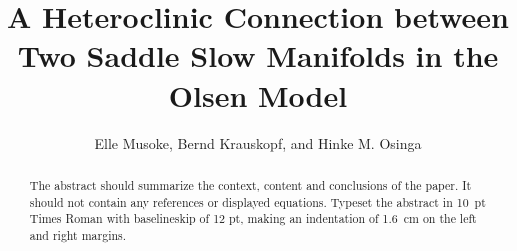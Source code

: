 \documentclass{ws-ijbc}
\begin{document}
\catchline{}{}{}{}{} %


\title{A Heteroclinic Connection between \\ Two Saddle Slow Manifolds in the Olsen Model}

\author{Elle Musoke, Bernd Krauskopf, and Hinke M. Osinga}


\address{Department of Mathematics, University of Auckland, Private Bag 92019\\
Auckland, 1142, New Zealand\\
elle.musoke@auckland.ac.nz}

\maketitle

\begin{history}
\end{history}

\begin{abstract}
The abstract should summarize the context, content and conclusions
of the paper. It should not contain any references or displayed
equations. Typeset the abstract in 10~pt Times Roman with
baselineskip of 12 pt, making an indentation of 1.6~cm on the left
and right margins.
\end{abstract}

\end{document}
